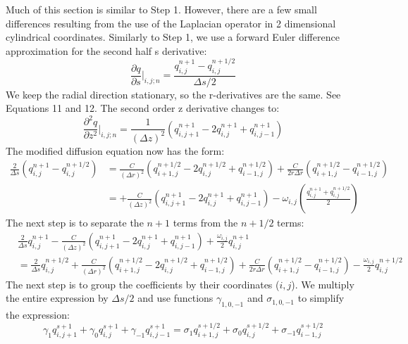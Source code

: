 \documentclass[11pt]{article} %
\begin{document}
Much of this section is similar to Step 1. However, there are a few small differences resulting from the use of the Laplacian operator in 2 dimensional cylindrical coordinates. Similarly to Step 1, we use a forward Euler difference approximation for the second half s derivative:
\begin{equation}
\frac{\partial q}{\partial s} \Big|_{i,j;n} = \dfrac{q_{i,j}^{n+1} - q_{i,j}^{n+1/2}}{\Delta s/2}
\end{equation}
\noindent
We keep the radial direction stationary, so the r-derivatives are the same. See Equations 11 and 12. The second order z derivative changes to:
\begin{equation}
\frac{\partial^2 q}{\partial z^2} \Big|_{i,j;n} = \frac{1}{(\Delta z)^2} \left( q_{i,j+1}^{n+1} -2q_{i,j}^{n+1}+ q_{i,j-1}^{n+1} \right)
\end{equation}
\noindent
The modified diffusion equation now has the form:
\begin{align}
\frac{2}{\Delta s} (q_{i,j}^{n+1} - q_{i,j}^{n+1/2}) &=  \frac{C}{(\Delta r)^2} \left( q_{i+1,j}^{n+1/2} -2q_{i,j}^{n+1/2} + q_{i-1,j}^{n+1/2} \right) +  \frac{C}{2r\Delta r} \left( q_{i+1,j}^{n+1/2} - q_{i-1,j}^{n+1/2} \right) \\
&=  + \frac{C}{(\Delta z)^2} \left( q_{i,j+1}^{n+1} -2q_{i,j}^{n+1} + q_{i,j-1}^{n+1} \right)  - \omega_{i,j} \left( \frac{q_{i,j}^{n+1} + q_{i,j}^{n+1/2}}{2} \right)
\end{align}
\noindent
The next step is to separate the $n+1$ terms from the $n+1/2$ terms:
\begin{align}
&\frac{2}{\Delta s} q_{i,j}^{n+1} - \frac{C}{(\Delta z)^2} \left( q_{i,j+1}^{n+1} -2q_{i,j}^{n+1} + q_{i,j-1}^{n+1} \right) + \frac{\omega_{i,j}}{2} q_{i,j}^{n+1} \\
& =\frac{2}{\Delta s} q_{i,j}^{n+1/2} + \frac{C}{(\Delta r)^2} \left( q_{i+1,j}^{n+1/2} -2q_{i,j}^{n+1/2} + q_{i-1,j}^{n+1/2} \right) + \frac{C}{2r\Delta r} \left( q_{i+1,j}^{n+1/2} - q_{i-1,j}^{n+1/2} \right) - \frac{\omega_{i,j}}{2} q_{i,j}^{n+1/2}
\end{align}
\noindent
The next step is to group the coefficients by their coordinates ($i,j$). We multiply the entire expression by $\Delta s/2$ and use functions $\gamma_{1,0,-1}$ and $\sigma_{1,0,-1}$ to simplify the expression:
\begin{equation}
\gamma_1 q_{i,j+1}^{s+1} + \gamma_0 q_{i,j}^{s+1} + \gamma_{-1} q_{i,j-1}^{s+1} = \sigma_1 q_{i+1,j}^{s+1/2} + \sigma_0 q_{i,j}^{s+1/2} + \sigma_{-1} q_{i-1,j}^{s+1/2}
\end{equation}
\end{document}
